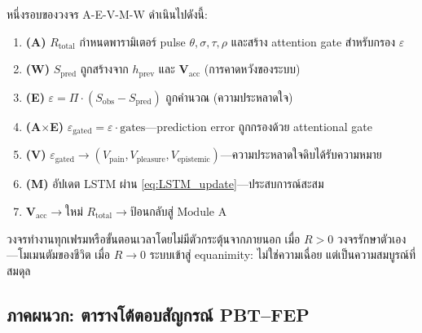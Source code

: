 \documentclass[12pt,a4paper]{article}
\newcommand{\Rtot}{R_{\mathrm{total}}}
\newcommand{\Vacc}{\mathbf{V}_{\mathrm{acc}}}
\newcommand{\Sobs}{S_{\mathrm{obs}}}
\newcommand{\Spred}{S_{\mathrm{pred}}}
\newcommand{\vpain}{V_{\mathrm{pain}}}
\newcommand{\vpleasure}{V_{\mathrm{pleasure}}}
\newcommand{\vepi}{V_{\mathrm{epistemic}}}
\begin{document}
หนึ่งรอบของวงจร A-E-V-M-W ดำเนินไปดังนี้:

\begin{enumerate}[leftmargin=1.8em]
  \item \textbf{(A)} $\Rtot$ กำหนดพารามิเตอร์ pulse $\theta,\sigma,\tau,\rho$
    และสร้าง attention gate สำหรับกรอง $\varepsilon$
  \item \textbf{(W)} $\Spred$ ถูกสร้างจาก $h_{\mathrm{prev}}$ และ
    $\Vacc$ (การคาดหวังของระบบ)
  \item \textbf{(E)} $\varepsilon = \Pi\cdot(\Sobs - \Spred)$ ถูกคำนวณ (ความประหลาดใจ)
  \item \textbf{(A$\times$E)} $\varepsilon_{\mathrm{gated}} =
    \varepsilon\cdot\mathrm{gates}$---prediction error ถูกกรองด้วย attentional gate
  \item \textbf{(V)} $\varepsilon_{\mathrm{gated}} \to
    (\vpain, \vpleasure, \vepi)$---ความประหลาดใจดิบได้รับความหมาย
  \item \textbf{(M)} อัปเดต LSTM ผ่าน \eqref{eq:LSTM_update}---ประสบการณ์สะสม
  \item $\Vacc\to\text{ใหม่ }\Rtot\to\text{ป้อนกลับสู่ Module~A}$
\end{enumerate}

วงจรทำงานทุกเฟรมหรือขั้นตอนเวลาโดยไม่มีตัวกระตุ้นจากภายนอก
เมื่อ $R > 0$ วงจรรักษาตัวเอง---โมเมนตัมของชีวิต
เมื่อ $R\to 0$ ระบบเข้าสู่ equanimity: ไม่ใช่ความเฉื่อย แต่เป็นความสมบูรณ์ที่สมดุล

\subsection{ภาคผนวก: ตารางโต้ตอบสัญกรณ์ PBT--FEP}
\label{app:fep_mapping}
\end{document}
